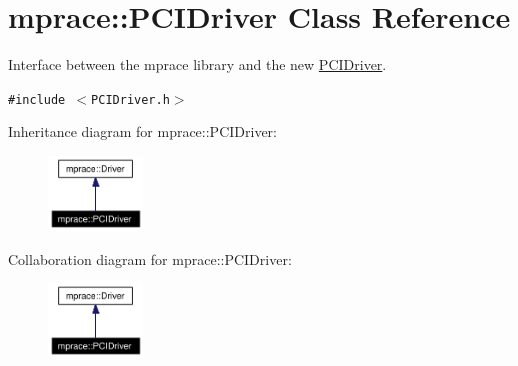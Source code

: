 \hypertarget{classmprace_1_1PCIDriver}{
\section{mprace::PCIDriver Class Reference}
\label{classmprace_1_1PCIDriver}
}
Interface between the mprace library and the new \hyperlink{classmprace_1_1PCIDriver}{PCIDriver}.  


{\tt \#include $<$PCIDriver.h$>$}

Inheritance diagram for mprace::PCIDriver:\begin{figure}[H]
\begin{center}
\leavevmode
\includegraphics[width=71pt]{classmprace_1_1PCIDriver__inherit__graph}
\end{center}
\end{figure}
Collaboration diagram for mprace::PCIDriver:\begin{figure}[H]
\begin{center}
\leavevmode
\includegraphics[width=71pt]{classmprace_1_1PCIDriver__coll__graph}
\end{center}
\end{figure}
